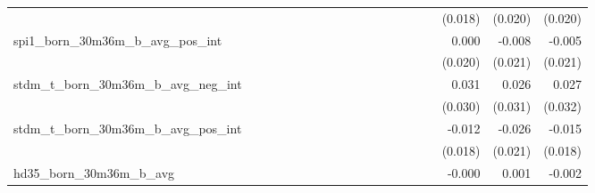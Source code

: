 \begin{tabular}{lrrrrrrrrrrrrrrrrrr}
                                            &              &              &              &              &              &              &              &              &               &              &              &               &              &              &               &      (0.018) &      (0.020) &       (0.020) \\ 
spi1\_born\_30m36m\_b\_avg\_pos\_int        &              &              &              &              &              &              &              &              &               &              &              &               &              &              &               &        0.000 &       -0.008 &        -0.005 \\ 
                                            &              &              &              &              &              &              &              &              &               &              &              &               &              &              &               &      (0.020) &      (0.021) &       (0.021) \\ 
stdm\_t\_born\_30m36m\_b\_avg\_neg\_int     &              &              &              &              &              &              &              &              &               &              &              &               &              &              &               &        0.031 &        0.026 &         0.027 \\ 
                                            &              &              &              &              &              &              &              &              &               &              &              &               &              &              &               &      (0.030) &      (0.031) &       (0.032) \\ 
stdm\_t\_born\_30m36m\_b\_avg\_pos\_int     &              &              &              &              &              &              &              &              &               &              &              &               &              &              &               &       -0.012 &       -0.026 &        -0.015 \\ 
                                            &              &              &              &              &              &              &              &              &               &              &              &               &              &              &               &      (0.018) &      (0.021) &       (0.018) \\ 
hd35\_born\_30m36m\_b\_avg                  &              &              &              &              &              &              &              &              &               &              &              &               &              &              &               &       -0.000 &        0.001 &        -0.002 \\ 

\end{tabular}

